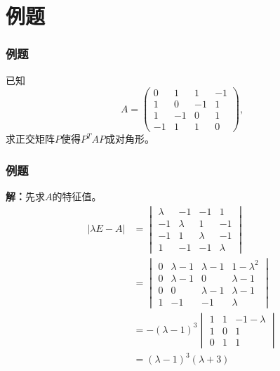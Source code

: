 
\section{例题}


\begin{frame}
\frametitle{例题}

\begin{eg}
已知
$$A = \begin{pmatrix} 0 & 1 & 1 & -1 \\ 1 & 0 & -1 & 1 \\ 1 & -1 & 0 & 1 \\ -1 & 1 & 1 & 0 \end{pmatrix},$$
求正交矩阵$P$使得$P^TAP$成对角形。
\end{eg}

\end{frame}


\begin{frame}
\frametitle{例题}

{\bfseries 解：}先求$A$的特征值。
\begin{align*}
    \lvert \lambda E - A \rvert & = \begin{vmatrix} \lambda & -1 & -1 & 1 \\ -1 & \lambda & 1 & -1 \\ -1 & 1 & \lambda & -1 \\ 1 & -1 & -1 & \lambda \end{vmatrix} \\
    & = \begin{vmatrix} 0 & \lambda-1 & \lambda-1 & 1-\lambda^2 \\ 0 & \lambda-1 & 0 & \lambda-1 \\ 0 & 0 & \lambda-1 & \lambda-1 \\ 1 & -1 & -1 & \lambda \end{vmatrix} \\
    & = - (\lambda - 1)^3 \begin{vmatrix} 1 & 1 & -1-\lambda \\ 1 & 0 & 1 \\ 0 & 1 & 1 \end{vmatrix} \\
    & = (\lambda - 1)^3 (\lambda + 3)
\end{align*}

\end{frame}

